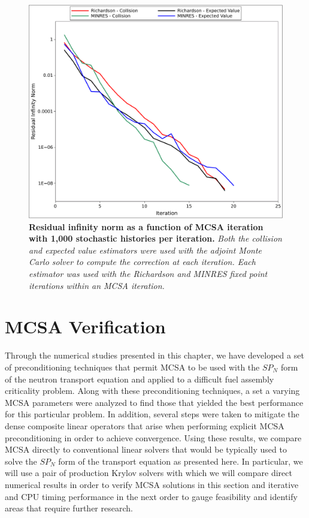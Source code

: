 \begin{figure}[t!]
  \begin{center}
    \includegraphics[width=6in]{chapters/spn_equations/estimator_convergence.pdf}
  \end{center}
  \caption{\textbf{Residual infinity norm as a function of MCSA
      iteration with 1,000 stochastic histories per iteration.}
    \textit{Both the collision and expected value estimators were used
      with the adjoint Monte Carlo solver to compute the correction at
      each iteration. Each estimator was used with the Richardson and
      MINRES fixed point iterations within an MCSA iteration.}}
  \label{fig:spn_estimator_convergence}
\end{figure}

\clearpage

\section{MCSA Verification}
\label{sec:spn_mcsa_verification}
Through the numerical studies presented in this chapter, we have
developed a set of preconditioning techniques that permit MCSA to be
used with the $SP_N$ form of the neutron transport equation and
applied to a difficult fuel assembly criticality problem. Along with
these preconditioning techniques, a set a varying MCSA parameters were
analyzed to find those that yielded the best performance for this
particular problem. In addition, several steps were taken to mitigate
the dense composite linear operators that arise when performing
explicit MCSA preconditioning in order to achieve convergence. Using
these results, we compare MCSA directly to conventional linear solvers
that would be typically used to solve the $SP_N$ form of the transport
equation as presented here. In particular, we will use a pair of
production Krylov solvers with which we will compare direct numerical
results in order to verify MCSA solutions in this section and
iterative and CPU timing performance in the next order to gauge
feasibility and identify areas that require further research.

